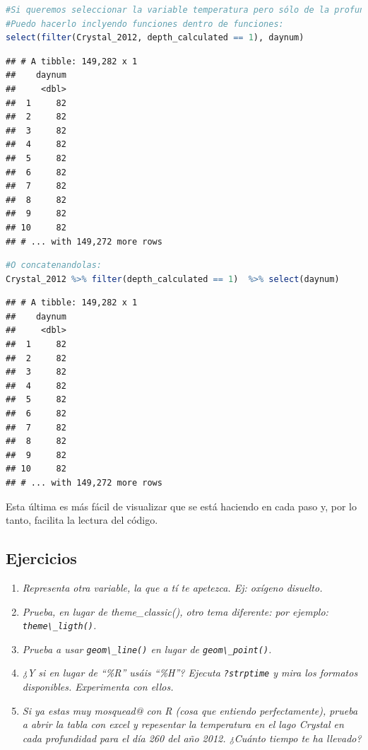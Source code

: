 \documentclass[
]{book}
\newcommand{\passthrough}[1]{#1}
\providecommand{\tightlist}{%
  \setlength{\itemsep}{0pt}\setlength{\parskip}{0pt}}
\begin{document}
\begin{lstlisting}[language=R]
#Si queremos seleccionar la variable temperatura pero sólo de la profundidad de 1 metro
#Puedo hacerlo inclyendo funciones dentro de funciones:
select(filter(Crystal_2012, depth_calculated == 1), daynum)
\end{lstlisting}

\begin{lstlisting}
## # A tibble: 149,282 x 1
##    daynum
##     <dbl>
##  1     82
##  2     82
##  3     82
##  4     82
##  5     82
##  6     82
##  7     82
##  8     82
##  9     82
## 10     82
## # ... with 149,272 more rows
\end{lstlisting}

\begin{lstlisting}[language=R]
#O concatenandolas:
Crystal_2012 %>% filter(depth_calculated == 1)  %>% select(daynum)
\end{lstlisting}

\begin{lstlisting}
## # A tibble: 149,282 x 1
##    daynum
##     <dbl>
##  1     82
##  2     82
##  3     82
##  4     82
##  5     82
##  6     82
##  7     82
##  8     82
##  9     82
## 10     82
## # ... with 149,272 more rows
\end{lstlisting}

Esta última es más fácil de visualizar que se está haciendo en cada paso y, por lo tanto, facilita la lectura del código.

\hypertarget{ejercicios-2}{%
\subsection{Ejercicios}\label{ejercicios-2}}

\begin{enumerate}
\def\labelenumi{\arabic{enumi}.}
\tightlist
\item
  \emph{Representa otra variable, la que a tí te apetezca. Ej: oxígeno disuelto.}
\item
  \emph{Prueba, en lugar de theme\_classic(), otro tema diferente: por ejemplo: \passthrough{\lstinline!theme\_ligth()!}.}
\item
  \emph{Prueba a usar \passthrough{\lstinline!geom\_line()!} en lugar de \passthrough{\lstinline!geom\_point()!}.}
\item
  \emph{¿Y si en lugar de ``\%R'' usáis ``\%H''? Ejecuta \passthrough{\lstinline!?strptime!} y mira los formatos disponibles. Experimenta con ellos.}
\item
  \emph{Si ya estas muy mosquead@ con R (cosa que entiendo perfectamente), prueba a abrir la tabla con excel y repesentar la temperatura en el lago Crystal en cada profundidad para el día 260 del año 2012. ¿Cuánto tiempo te ha llevado?}
\end{enumerate}
\end{document}
